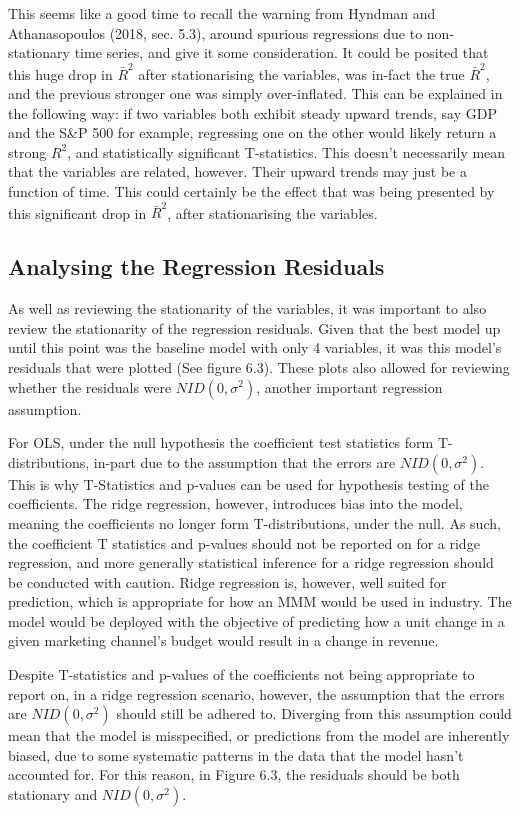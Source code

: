 \documentclass[11pt, a4paper]{article}
\begin{document}
This seems like a good time to recall the warning from Hyndman and Athanasopoulos (2018, sec. 5.3), around spurious regressions due to non-stationary time series, and give it some consideration. It could be posited that this huge drop in $\bar{R}^2$ after stationarising the variables, was in-fact the true $\bar{R}^2$, and the previous stronger one was simply over-inflated. This can be explained in the following way: if two variables both exhibit steady upward trends, say GDP and the S\&P 500 for example, regressing one on the other would likely return a strong $R^2$, and statistically significant T-statistics. This doesn’t necessarily mean that the variables are related, however. Their upward trends may just be a function of time. This could certainly be the effect that was being presented by this significant drop in $\bar{R}^2$, after stationarising the variables. 

\subsection{Analysing the Regression Residuals}

As well as reviewing the stationarity of the variables, it was important to also review the stationarity of the regression residuals. Given that the best model up until this point was the baseline model with only 4 variables, it was this model’s residuals that were plotted (See figure 6.3). These plots also allowed for reviewing whether the residuals were $NID (0, \sigma^2 )$, another important regression assumption. 

For OLS, under the null hypothesis the coefficient test statistics form T-distributions, in-part due to the assumption that the errors are $NID (0, \sigma^2 )$. This is why T-Statistics and p-values can be used for hypothesis testing of the coefficients. The ridge regression, however, introduces bias into the model, meaning the coefficients no longer form T-distributions, under the null. As such, the coefficient T statistics and p-values should not be reported on for a ridge regression, and more generally statistical inference for a ridge regression should be conducted with caution. Ridge regression is, however, well suited for prediction, which is appropriate for how an MMM would be used in industry. The model would be deployed with the objective of predicting how a unit change in a given marketing channel’s budget would result in a change in revenue. 

Despite T-statistics and p-values of the coefficients not being appropriate to report on, in a ridge regression scenario, however, the assumption that the errors are $NID (0, \sigma^2 )$ should still be adhered to. Diverging from this assumption could mean that the model is misspecified, or predictions from the model are inherently biased, due to some systematic patterns in the data that the model hasn’t accounted for. For this reason, in Figure 6.3, the residuals should be both stationary and $NID (0, \sigma^2 )$.
\end{document}

